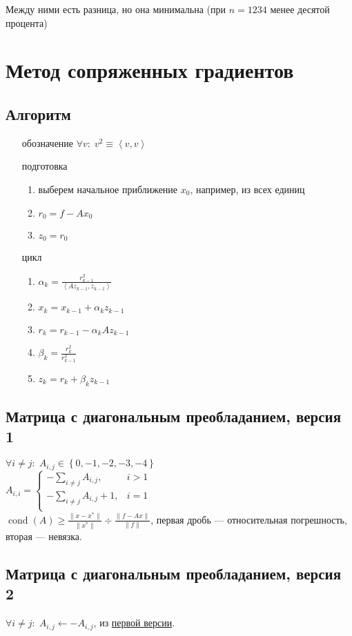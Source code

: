 \documentclass[russian, english]{article}
\newcommand{\mydot}[2]{\left\langle#1,#2\right\rangle}
\begin{document}
Между ними есть разница, но она минимальна (при $n = 1234$ менее десятой процента)

\section{Метод сопряженных градиентов}
\subsection{Алгоритм}
\begin{itemize}
	\item[обозначение] $\forall v:\; v^2\equiv \mydot{v}{v}$
	\item[подготовка]
		\begin{enumerate}
			\item выберем начальное приближение $x_0$, например, из всех единиц
			\item $r_0 = f - Ax_0$
			\item $z_0 = r_0$
		\end{enumerate}
	\item[цикл]
		\begin{enumerate}
			\item $\alpha_k=\frac{r_{k-1}^2}{\mydot{Az_{k-1}}{z_{k-1}}}$
			\item $x_k=x_{k-1}+\alpha_kz_{k-1}$
			\item $r_k=r_{k-1}-\alpha_kAz_{k-1}$
			\item $\beta_k=\frac{r_k^2}{r_{k-1}^2}$
			\item $z_k=r_k+\beta_kz_{k-1}$
		\end{enumerate}
\end{itemize}
\subsection{Матрица с диагональным преобладанием, версия 1}
\label{DiagonalPrMatrix}
$\forall i\neq j:\; A_{i, j}\in\left\{0, -1, -2, -3, -4\right\}$\\
$A_{i,i}=\begin{cases}
-\sum_{i\neq j}A_{i, j}, & i > 1\\
-\sum_{i\neq j}A_{i, j} + 1, & i = 1\\
\end{cases}$\\
$\operatorname{cond}(A) \ge \frac{\|x-x^*\|}{\|x^*\|}\div\frac{\|f-Ax\|}{\|f\|}$, первая дробь --- относительная погрешность, вторая --- невязка.

\subsection{Матрица с диагональным преобладанием, версия 2}
$\forall i\neq j:\;A_{i, j}\leftarrow -A_{i, j}$, из \hyperref[DiagonalPrMatrix]{первой версии}.
\end{document}
